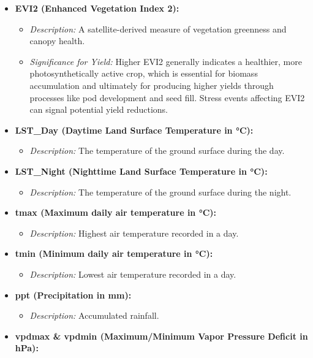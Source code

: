 \documentclass[
  letterpaper,
  DIV=11,
  numbers=noendperiod]{scrreprt}
\providecommand{\tightlist}{%
  \setlength{\itemsep}{0pt}\setlength{\parskip}{0pt}}\usepackage{longtable,booktabs,array}
\begin{document}
\begin{itemize}
\tightlist
\item
  \textbf{EVI2 (Enhanced Vegetation Index 2):}

  \begin{itemize}
  \tightlist
  \item
    \emph{Description:} A satellite-derived measure of vegetation
    greenness and canopy health.
  \item
    \emph{Significance for Yield:} Higher EVI2 generally indicates a
    healthier, more photosynthetically active crop, which is essential
    for biomass accumulation and ultimately for producing higher yields
    through processes like pod development and seed fill. Stress events
    affecting EVI2 can signal potential yield reductions.
  \end{itemize}
\item
  \textbf{LST\_Day (Daytime Land Surface Temperature in °C):}

  \begin{itemize}
  \tightlist
  \item
    \emph{Description:} The temperature of the ground surface during the
    day.
  \end{itemize}
\item
  \textbf{LST\_Night (Nighttime Land Surface Temperature in °C):}

  \begin{itemize}
  \tightlist
  \item
    \emph{Description:} The temperature of the ground surface during the
    night.
  \end{itemize}
\item
  \textbf{tmax (Maximum daily air temperature in °C):}

  \begin{itemize}
  \tightlist
  \item
    \emph{Description:} Highest air temperature recorded in a day.
  \end{itemize}
\item
  \textbf{tmin (Minimum daily air temperature in °C):}

  \begin{itemize}
  \tightlist
  \item
    \emph{Description:} Lowest air temperature recorded in a day.
  \end{itemize}
\item
  \textbf{ppt (Precipitation in mm):}

  \begin{itemize}
  \tightlist
  \item
    \emph{Description:} Accumulated rainfall.
  \end{itemize}
\item
  \textbf{vpdmax \& vpdmin (Maximum/Minimum Vapor Pressure Deficit in
  hPa):}


\end{itemize}
\end{document}
